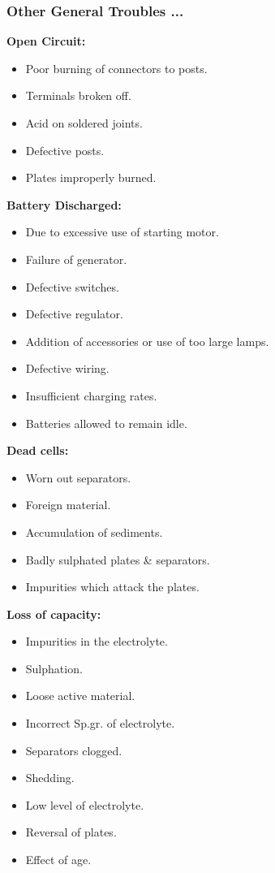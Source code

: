 \documentclass{beamer}
\begin{document}
\begin{frame}     %
  \frametitle{Other General Troubles ...}
  \fontsize{8pt}{12}\selectfont
  
  \textbf{Open Circuit:}
  \begin{itemize}
    \item Poor burning of connectors to posts.
    \item Terminals broken off.
    \item Acid on soldered joints.
    \item Defective posts.
    \item Plates improperly burned.
  \end{itemize}
  
  \textbf{Battery Discharged:}
  \begin{itemize}
    \item Due to excessive use of starting motor.
    \item Failure of generator.
    \item Defective switches.
    \item Defective regulator.
    \item Addition of accessories or use of too large lamps.
    \item Defective wiring.
    \item Insufficient charging rates.
    \item Batteries allowed to remain idle.
  \end{itemize}
\end{frame}

\begin{frame}     %
  \fontsize{8pt}{12}\selectfont
  
  \textbf{Dead cells:}
  \begin{itemize}
    \item Worn out separators.
    \item Foreign material.
    \item Accumulation of sediments.
    \item Badly sulphated plates \& separators.
    \item Impurities which attack the plates.
  \end{itemize}
  
  \textbf{Loss of capacity:}
  \begin{itemize}
    \item Impurities in the electrolyte.
    \item Sulphation.
    \item Loose active material.
    \item Incorrect Sp.gr. of electrolyte.
    \item Separators clogged.
    \item Shedding.
    \item Low level of electrolyte.
    \item Reversal of plates.
    \item Effect of age.
  \end{itemize}
\end{frame}
\end{document}

